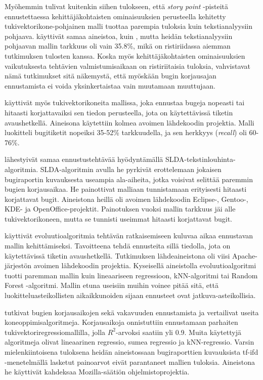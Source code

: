 \documentclass[utf8]{gradu3}
\begin{document}
Myöhemmin \textcite{Scott-2018} tulivat kuitenkin siihen tulokseen, että
\textit{story point} -pisteitä ennustettaessa kehittäjäkohtaisten ominaisuuksien
perusteella kehitetty tukivektorikone-pohjainen malli tuottaa parempia tuloksia
kuin tekstianalyysiin pohjaava. \textcite{Scott-2018} käyttivät samaa aineistoa,
kuin \textcite{Porru-2016}, mutta heidän tekstianalyysiin pohjaavan mallin
tarkkuus oli vain 35.8\%, mikä on ristiriidassa aiemman tutkimuksen tulosten
kanssa. Koska myös kehittäjäkohtaisten ominaisuuksien vaikutuksesta tehtävien
valmistumisaikaan on ristiriitaisia tuloksia, vahvistavat nämä tutkimukset sitä
näkemystä, että myöskään bugin korjausajan ennustamista ei voida yksinkertaistaa
vain muutamaan muuttujaan.

\textcite{Ardimento-2017} käyttivät myös tukivektorikoneita mallissa, joka
ennustaa bugeja nopeasti tai hitaasti korjattavaiksi sen tiedon perusteella,
jota on käytettävissä tiketin avaushetkellä. Aineisona käytettiin kolmea avoimen
lähdekoodin projektia. Malli luokitteli bugitiketit nopeiksi 35-52\%
tarkkuudella, ja sen herkkyys (\textit{recall}) oli 60-76\%. 

\textcite{Ardimento-2016} lähestyivät samaa ennustustehtävää hyödyntämällä
SLDA-tekstinlouhinta-algoritmia. SLDA-algoritmin avulla he pyrkivät erottelemaan
jokaisen bugiraportin kuvauksesta useampia ala-aiheita, jotka voisivat selittää
paremmin bugien korjausaikaa. He painottivat malliaan tunnistamaan erityisesti
hitaasti korjattavat bugit. Aineistona heillä oli avoimen lähdekoodin Eclipse-,
Gentoo-, KDE- ja OpenOffice-projektit. Painotuksen vuoksi mallin tarkkuus jäi
alle tukivektorikoneen, mutta se tunnisti useimmat hitaasti korjattavat bugit.

\textcite{Al-Zubaidi-2017} käyttivät evoluutioalgoritmia tehtävän ratkaisemiseen
kuluvaa aikaa ennustavan mallin kehittämiseksi. Tavoitteena tehdä ennusteita
sillä tiedolla, jota on käytettävissä tiketin avaushetkellä. Tutkimuksen
lähdeaineistona oli viisi Apache-järjestön avoimen lähdekoodin projektia.
Kyseisellä aineistolla evoluutioalgoritmi tuotti paremman mallin kuin
lineaariseen regressioon, kNN-algoritmi tai Random Forest -algoritmi. Mallin
etuna useisiin muihin voinee pitää sitä, että luokitteluasteikollisten
aikaikkunoiden sijaan ennusteet ovat jatkuva-asteikollisia.

\textcite{Sharma-2019} tutkivat bugien korjausaikojen sekä vakavuuden
ennustamista ja vertailivat useita koneoppimisalgoritmeja. Korjausaikoja
onnistuttiin ennustamaan parhaiten tukivektoriregressiomallilla, jolla
\(R^2\)-arvoksi saatiin yli 0.9. Muita käytettyjä algoritmeja olivat lineaarinen
regressio, sumea regressio ja kNN-regressio. Varsin mielenkiintoisena tuloksena
heidän aineistossaan bugiraporttien kuvauksista tf-ifd -menetelmällä lasketut
painoarvot eivät parantaneet mallien tuloksia. Aineistona he käyttivät kahdeksaa
Mozilla-säätiön ohjelmistoprojektia.
\end{document}
